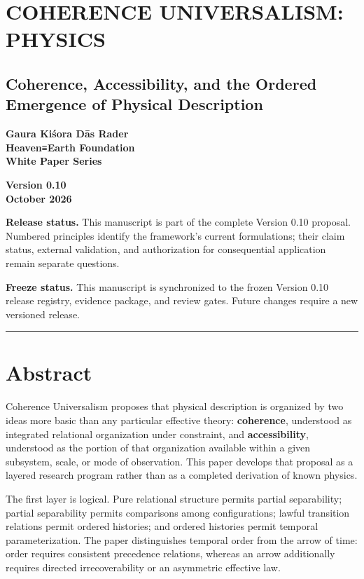 \documentclass[
  11pt,
]{article}
\author{}
\date{}
\begin{document}
\section{COHERENCE UNIVERSALISM:
PHYSICS}\label{coherence-universalism-physics}

\subsection{Coherence, Accessibility, and the Ordered Emergence of
Physical
Description}\label{coherence-accessibility-and-the-ordered-emergence-of-physical-description}

\textbf{Gaura Kiśora Dās Rader}\\
\textbf{Heaven≡Earth Foundation}\\
\textbf{White Paper Series}

\textbf{Version 0.10}\\
\textbf{October 2026}

\textbf{Release status.} This manuscript is part of the complete Version
0.10 proposal. Numbered principles identify the framework's current
formulations; their claim status, external validation, and authorization
for consequential application remain separate questions.

\textbf{Freeze status.} This manuscript is synchronized to the frozen
Version 0.10 release registry, evidence package, and review gates.
Future changes require a new versioned release.

\begin{center}\rule{0.5\linewidth}{0.5pt}\end{center}

\section{Abstract}\label{abstract}

Coherence Universalism proposes that physical description is organized
by two ideas more basic than any particular effective theory:
\textbf{coherence}, understood as integrated relational organization
under constraint, and \textbf{accessibility}, understood as the portion
of that organization available within a given subsystem, scale, or mode
of observation. This paper develops that proposal as a layered research
program rather than as a completed derivation of known physics.

The first layer is logical. Pure relational structure permits partial
separability; partial separability permits comparisons among
configurations; lawful transition relations permit ordered histories;
and ordered histories permit temporal parameterization. The paper
distinguishes temporal order from the arrow of time: order requires
consistent precedence relations, whereas an arrow additionally requires
directed irrecoverability or an asymmetric effective law.
\end{document}
